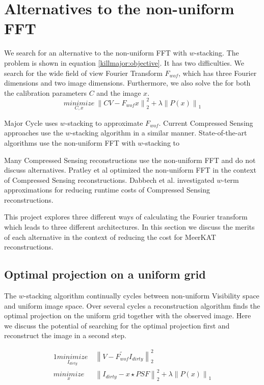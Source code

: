\section{Alternatives to the non-uniform FFT}\label{killmajor}

We search for an alternative to the non-uniform FFT with $w$-stacking. The problem is shown in equation \eqref{killmajor:objective}. It has two difficulties. We search for the wide field of view Fourier Transform $F_{wof}$, which has three Fourier dimensions and two image dimensions. Furthermore, we also solve the for both the calibration parameters $C$ and the image $x$.
\begin{equation}\label{killmajor:objective}
\underset{C, x}{minimize} \: \left \| CV - F_{wof}x \right \|_2^2 + \lambda \left \| P(x) \right \|_1
\end{equation}

Major Cycle uses $w$-stacking to approximate $F_{wof}$. Current Compressed Sensing approaches use the $w$-stacking algorithm in a similar manner.
State-of-the-art algorithms use the non-uniform FFT with $w$-stacking to 


Many Compressed Sensing reconstructions use the non-uniform FFT\cite{girard2015sparse, dabbech2018cygnus, mcewen2011compressed, pratley2018fast}  and do not discuss alternatives. Pratley et al\cite{pratley2017robust} optimized the non-uniform FFT in the context of Compressed Sensing reconstructions. Dabbech et al.\cite{dabbech2017wEffect} investigated $w$-term approximations for reducing runtime costs of Compressed Sensing reconstructions.

This project explores three different ways of calculating the Fourier transform which leads to three different architectures. In this section we discuss the merits of each alternative in the context of reducing the cost for MeerKAT reconstructions.

\subsection{Optimal projection on a uniform grid}
The $w$-stacking algorithm continually cycles between non-uniform Visibility space and uniform image space. Over several cycles a reconstruction algorithm finds the optimal projection on the uniform grid together with the observed image. Here we discuss the potential of searching for the optimal projection first and reconstruct the image in a second step.

\begin{alignat}{1}
\underset{I_{dirty}}{minimize} \:& \left \|  V - \tilde{F_{wof}}I_{dirty} \right \|_2^2\label{killmajor:sep:major}\\
\underset{x}{minimize} \:& \left \| I_{dirty} - x \star PSF \right \|_2^2 + \lambda \left \| P(x) \right \|_1 \label{killmajor:sep:deconv}
\end{alignat}


